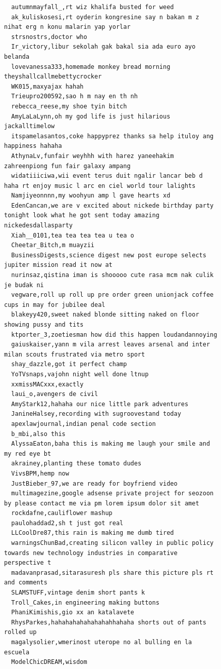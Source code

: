\begin{figure}[htpb]
\begin{verbatim}
  autumnmayfall_,rt wiz khalifa busted for weed
  ak_kuliskosesi,rt oyderin kongresine say n bakan m z nihat erg n konu malarin yap yorlar
  strsnostrs,doctor who
  Ir_victory,libur sekolah gak bakal sia ada euro ayo belanda
  lovevanessa333,homemade monkey bread morning theyshallcallmebettycrocker
  WK015,maxyajax hahah
  Trieupro200592,sao h m nay en th nh
  rebecca_reese,my shoe tyin bitch
  AmyLaLaLynn,oh my god life is just hilarious jackalltimelow
  itspamelasantos,coke happyprez thanks sa help ituloy ang happiness hahaha
  AthynaLv,funfair weyhhh with harez yaneehakim zahreenpiong fun fair galaxy ampang
  widatiiiciwa,wii event terus duit ngalir lancar beb d haha rt enjoy music l arc en ciel world tour lalights
  Namjiyeonnnn,my woohyun amp l gave hearts xd
  EdenCancan,we are v excited about nickede birthday party tonight look what he got sent today amazing nickedesdallasparty
  Xiah__0101,tea tea tea tea u tea o
  Cheetar_Bitch,m muayzii
  BusinessDigests,science digest new post europe selects jupiter mission read it now at
  nurinsaz,qistina iman is shooooo cute rasa mcm nak culik je budak ni
  vegware,roll up roll up pre order green unionjack coffee cups in may for jubilee deal
  blakeyy420,sweet naked blonde sitting naked on floor showing pussy and tits
  ktporter_3,zoetiesman how did this happen loudandannoying
  gaiuskaiser,yann m vila arrest leaves arsenal and inter milan scouts frustrated via metro sport
  shay_dazzle,got it perfect champ
  YoTVsnaps,vajohn night well done ltnup
  xxmissMACxxx,exactly
  laui_o,avengers de civil
  AmyStark12,hahaha our nice little park adventures
  JanineHalsey,recording with sugroovestand today
  apexlawjournal,indian penal code section
  b_mbi,also this
  AlyssaEaton,baha this is making me laugh your smile and my red eye bt
  akrainey,planting these tomato dudes
  VivsBPM,hemp now
  JustBieber_97,we are ready for boyfriend video
  multimagezine,google adsense private project for seozoon by please contact me via pm lorem ipsum dolor sit amet
  rockdafne,cauliflower mashup
  paulohaddad2,sh t just got real
  LLCoolDre87,this rain is making me dumb tired
  warningsChunBad,creating silicon valley in public policy towards new technology industries in comparative perspective t
  madavanprasad,sitarasuresh pls share this picture pls rt and comments
  SLAMSTUFF,vintage denim short pants k
  Troll_Cakes,in engineering making buttons
  PhaniKimishis,gio xx an katalavete
  RhysParkes,hahahahahahahahahhahaha shorts out of pants rolled up
  magalysolier,wmerinost uterope no al bulling en la escuela
  ModelChicDREAM,wisdom

\end{verbatim}
\end{figure}
